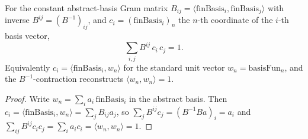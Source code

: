 \begin{lemma}[inverse-Gram/coordinate identity $\sum_{ij}B^{ij}c_ic_j=1$]
  \label{lem:dc-ch8-3-inverse-gram-coord}
  \leanok
  For the constant abstract-basis Gram matrix
  $B_{ij}=\langle\text{finBasis}_i,\text{finBasis}_j\rangle$ with inverse
  $B^{ij}=(B^{-1})_{ij}$, and $c_i=(\text{finBasis}_i)_n$ the $n$-th coordinate of
  the $i$-th basis vector,
  $$\sum_{i,j} B^{ij}\,c_i\,c_j = 1.$$
  Equivalently $c_i=\langle\text{finBasis}_i, w_n\rangle$ for the standard unit
  vector $w_n=\text{basisFun}_n$, and the $B^{-1}$-contraction reconstructs
  $\langle w_n, w_n\rangle=1$.
\end{lemma}
\begin{proof}
  \leanok
\sketch
  Write $w_n=\sum_i a_i\,\text{finBasis}_i$ in the abstract basis. Then
  $c_i=\langle\text{finBasis}_i,w_n\rangle=\sum_j
  B_{ij}a_j$, so $\sum_j B^{ij}c_j=(B^{-1}B a)_i=a_i$ and
  $\sum_{ij}B^{ij}c_ic_j=\sum_i a_i c_i=\langle w_n,w_n\rangle=1$.
\end{proof}

